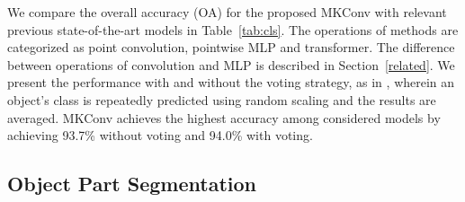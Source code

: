 \documentclass[preprint,12pt]{elsarticle}
\begin{document}
\begin{comment}
FPConv~\citep{lin2020fpconv}  & Conv.    &  xyz& 1024     & 92.5 \\
PointASNL~\citep{yan2020pointasnl}& Conv. &  xyz& 1024     & 92.9  \\
RS-CNN~\citep{liu2019relation} w/o vot.& Conv.  &  xyz &1024  & 92.9  \\
RS-CNN~\citep{liu2019relation} w/ vot. & Conv. &  xyz &1024  & 93.6 \\
InterpCNN~\citep{mao2019interpolated}  & Conv.   &  xyz& 1024   & 93.0 \\
PAConv~\citep{xu2021paconv} w/o vot.& Conv. &   xyz&1024  & 93.6 \\
PAConv~\citep{xu2021paconv} w/ vot. & Conv. &   xyz&1024  & 93.9  \Bstrut\\
\textbf{MKConv} w/o vot. & Conv.   &   xyz&1024  & \textbf{93.7} \\
\textbf{MKConv} w/ vot.  & Conv.   &   xyz&1024   & \textbf{94.0}  \\
\hline
\end{tabular}
\label{tab:cls}\end{center}
\end{table*}
\end{comment}



We compare the overall accuracy (OA) for the proposed MKConv with relevant previous state-of-the-art models in Table~\ref{tab:cls}. The operations of methods are categorized as point convolution, pointwise MLP and transformer. The difference between operations of convolution and MLP is described in Section~\ref{related}. We present the performance with and without the voting strategy, as in \cite{liu2019relation,xu2021paconv}, wherein an object’s class is repeatedly predicted using random scaling and the results are averaged. MKConv achieves the highest accuracy among considered models by achieving 93.7\% without voting and 94.0\% with voting.





\subsection{Object Part Segmentation}
\label{sec:psg}
\end{document}
